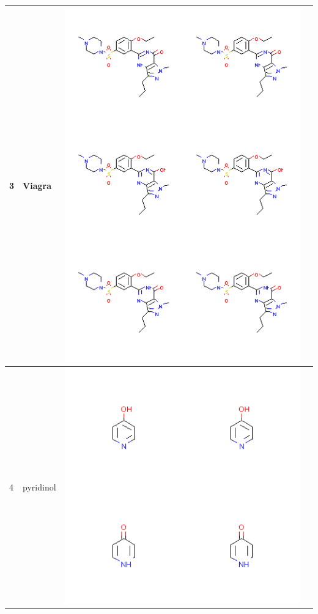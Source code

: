 \begin{longtable}{|l|l|l|l|}
3 & Viagra & \includegraphics[scale=0.6]{Viagra.png} & \\
\hline
4 & pyridinol & \includegraphics[scale=0.6]{pyridinol.png} & \\

\end{longtable}
